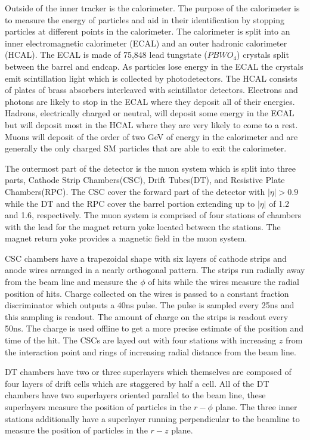 Outside of the inner tracker is the calorimeter. The purpose of the calorimeter is to measure the energy of particles and aid in their identification by stopping
particles at different points in the calorimeter.  The calorimeter is split into an inner electromagnetic calorimeter (ECAL) and an outer hadronic calorimeter (HCAL). 
The ECAL is made of 75,848 lead tungstate ($PBWO_4$) crystals split between the barrel and endcap. As particles lose energy in the ECAL
the crystals emit scintillation light which is collected by photodetectors. The HCAL consists of plates of brass absorbers interleaved with scintillator
detectors.  Electrons and photons are likely to stop in the ECAL where they deposit all of their energies. Hadrons, electrically charged or neutral, will
deposit some energy in the ECAL but will deposit most in the HCAL where they are very likely to come to a rest. Muons will deposit of the order of two GeV of energy in
the calorimeter and are generally the only charged SM particles that are able to exit the calorimeter.

The outermost part of the detector is the muon system which is split into three parts, Cathode Strip Chambers(CSC), Drift Tubes(DT), and Resistive Plate Chambers(RPC).
The CSC cover the forward part of the detector with $|\eta|>0.9$ while the DT and the RPC cover the barrel portion extending up to $|\eta|$ of 1.2 and 1.6, respectively.
The muon system is comprised of four stations of chambers with the lead for the magnet return yoke located between the stations. The magnet return yoke provides a magnetic field
in the muon system.

CSC chambers have a trapezoidal shape with six layers of cathode strips and anode wires arranged in a nearly orthogonal pattern. 
The strips run radially away from the beam line and measure the $\phi$ of hits while the wires measure the radial position of hits. Charge collected on the wires
is passed to a constant fraction discriminator which outputs a 40ns pulse. The pulse is sampled every 25ns and this sampling is readout. The amount of charge on the strips
is readout every 50ns. The charge is used offline to get a more precise estimate of the position and time of the hit.
The CSCs are layed out with four stations with increasing $z$ from the interaction point and rings of increasing radial distance from the beam line.

DT chambers have two or three superlayers which themselves are composed of four layers of drift cells which are staggered by half a cell. All of the DT chambers have
two superlayers oriented parallel to the beam line, these superlayers measure the position of particles in the $r-\phi$ plane.
The three inner stations additionally have a superlayer running perpendicular to the beamline to measure the position of particles in the $r-z$ plane.

